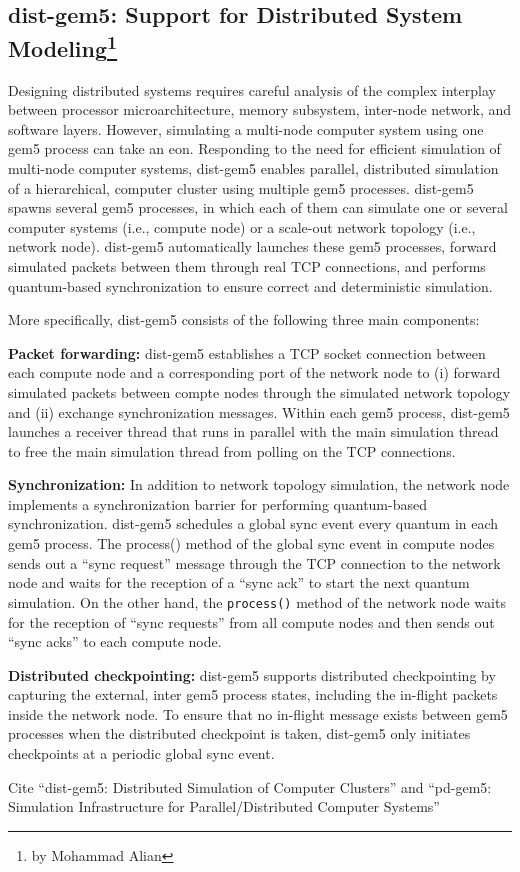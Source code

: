 \subsection[dist-gem5: Support for Distributed System Modeling]{dist-gem5: Support for Distributed System Modeling\footnote{by Mohammad Alian}}

Designing distributed systems requires careful analysis of the complex interplay between processor
microarchitecture, memory subsystem, inter-node network, and software layers.
However, simulating a multi-node computer system using one gem5 process can take an eon.
Responding to the need for efficient simulation of multi-node computer systems, dist-gem5 enables parallel, distributed simulation of a hierarchical, computer cluster using multiple gem5 processes.
dist-gem5 spawns several gem5 processes, in which each of them can simulate one or several computer systems (i.e., compute node) or a scale-out network topology (i.e., network node).
dist-gem5 automatically launches these gem5 processes, forward simulated packets between them through real TCP connections, and performs quantum-based synchronization to ensure correct and deterministic simulation.

More specifically, dist-gem5 consists of the following three main components:

\textbf{Packet forwarding:} dist-gem5 establishes a TCP socket connection between each compute node and a corresponding port of the network node to (i) forward simulated packets between compte nodes
through the simulated network topology and (ii) exchange synchronization messages.
Within each gem5 process, dist-gem5 launches a receiver thread that runs in parallel with the main simulation thread to free the main simulation thread from polling on the TCP connections.

\textbf{Synchronization:} In addition to network topology simulation, the network node implements a
synchronization barrier for performing quantum-based synchronization.
dist-gem5 schedules a global
sync event every quantum in each gem5 process.
The process() method of the global sync event in
compute nodes sends out a ``sync request'' message through the TCP connection to the network node
and waits for the reception of a ``sync ack'' to start the next quantum simulation.
On the other hand, the \verb|process()| method of the network node waits for the reception of ``sync requests'' from all compute nodes and then sends out ``sync acks'' to each compute node.

\textbf{Distributed checkpointing:} dist-gem5 supports distributed checkpointing by capturing the external, inter gem5 process states, including the in-flight packets inside the network node.
To ensure that no in-flight message exists between gem5 processes when the distributed checkpoint is taken, dist-gem5 only initiates checkpoints at a periodic global sync event.

Cite ``dist-gem5: Distributed Simulation of Computer Clusters'' and ``pd-gem5: Simulation Infrastructure for Parallel/Distributed Computer Systems''
